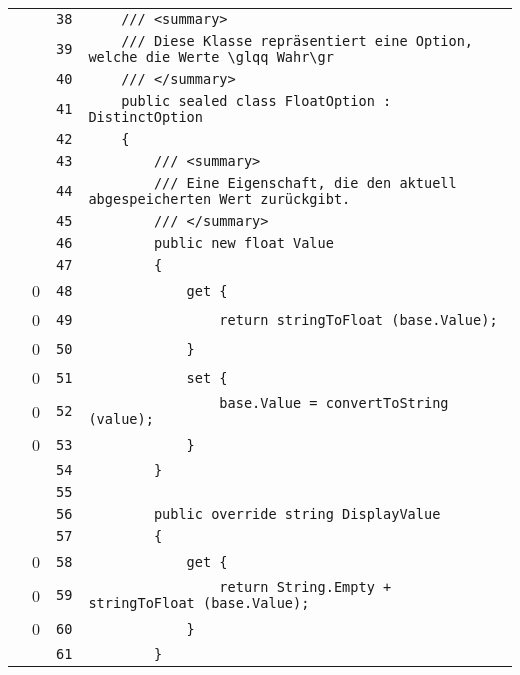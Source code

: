 \documentclass[a4paper,10pt]{article}
\begin{document}
\begin{longtable}[l]{lrrl}
\cellcolor{gray} &  & \verb~38~ & \verb~    /// <summary>~\\
\cellcolor{gray} &  & \verb~39~ & \verb~    /// Diese Klasse repräsentiert eine Option, welche die Werte \glqq Wahr\gr~\\
\cellcolor{gray} &  & \verb~40~ & \verb~    /// </summary>~\\
\cellcolor{gray} &  & \verb~41~ & \verb~    public sealed class FloatOption : DistinctOption~\\
\cellcolor{gray} &  & \verb~42~ & \verb~    {~\\
\cellcolor{gray} &  & \verb~43~ & \verb~        /// <summary>~\\
\cellcolor{gray} &  & \verb~44~ & \verb~        /// Eine Eigenschaft, die den aktuell abgespeicherten Wert zurückgibt.~\\
\cellcolor{gray} &  & \verb~45~ & \verb~        /// </summary>~\\
\cellcolor{gray} &  & \verb~46~ & \verb~        public new float Value~\\
\cellcolor{gray} &  & \verb~47~ & \verb~        {~\\
\cellcolor{red} & 0 & \verb~48~ & \verb~            get {~\\
\cellcolor{red} & 0 & \verb~49~ & \verb~                return stringToFloat (base.Value);~\\
\cellcolor{red} & 0 & \verb~50~ & \verb~            }~\\
\cellcolor{red} & 0 & \verb~51~ & \verb~            set {~\\
\cellcolor{red} & 0 & \verb~52~ & \verb~                base.Value = convertToString (value);~\\
\cellcolor{red} & 0 & \verb~53~ & \verb~            }~\\
\cellcolor{gray} &  & \verb~54~ & \verb~        }~\\
\cellcolor{gray} &  & \verb~55~ & \verb~~\\
\cellcolor{gray} &  & \verb~56~ & \verb~        public override string DisplayValue~\\
\cellcolor{gray} &  & \verb~57~ & \verb~        {~\\
\cellcolor{red} & 0 & \verb~58~ & \verb~            get {~\\
\cellcolor{red} & 0 & \verb~59~ & \verb~                return String.Empty + stringToFloat (base.Value);~\\
\cellcolor{red} & 0 & \verb~60~ & \verb~            }~\\
\cellcolor{gray} &  & \verb~61~ & \verb~        }~\\

\end{longtable}
\end{document}
